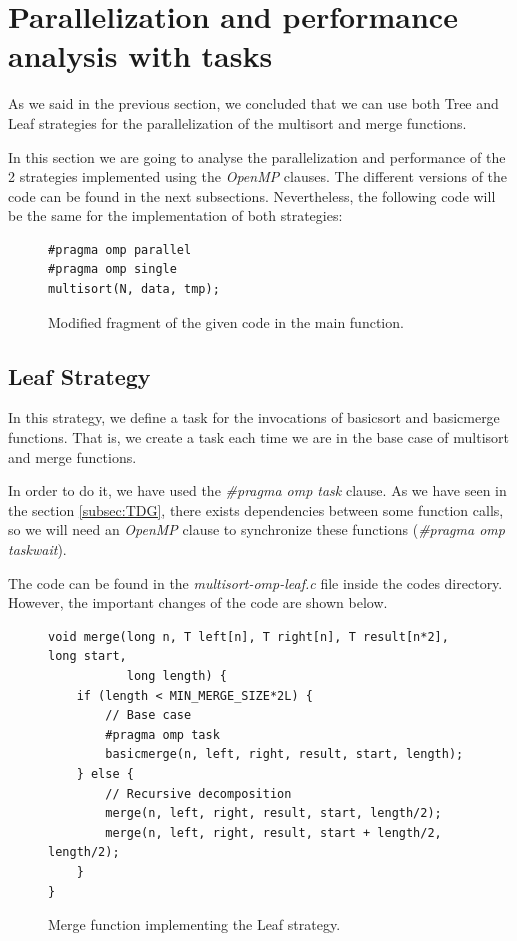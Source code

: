 \documentclass[12pt, a4paper]{article}
\begin{document}
\section{Parallelization and performance analysis with tasks}

As we said in the previous section, we concluded that we can use both Tree and Leaf strategies for the parallelization of the multisort and merge functions.

In this section we are going to analyse the parallelization and performance of the 2 strategies implemented using the \textit{OpenMP} clauses. The different versions of the code can be found in the next subsections. Nevertheless, the following code will be the same for the implementation of both strategies:

\begin{figure}[H]
\begin{lstlisting}
#pragma omp parallel
#pragma omp single
multisort(N, data, tmp);
\end{lstlisting}

\caption{Modified fragment of the given code in the main function.}
\end{figure}

\subsection{Leaf Strategy}

In this strategy, we define a task for the invocations of basicsort and basicmerge functions. That is, we create a task each time we are in the base case of multisort and merge functions.

In order to do it, we have used the \textit{\#pragma omp task} clause. As we have seen in the section \ref{subsec:TDG}, there exists dependencies between some function calls, so we will need an \textit{OpenMP} clause to synchronize these functions (\textit{\#pragma omp taskwait}).

The code can be found in the \textit{multisort-omp-leaf.c} file inside the codes directory. However, the important changes of the code are shown below.

\begin{figure}[H]
\begin{lstlisting}
void merge(long n, T left[n], T right[n], T result[n*2], long start,
		   long length) {
    if (length < MIN_MERGE_SIZE*2L) {
        // Base case
        #pragma omp task
        basicmerge(n, left, right, result, start, length);
    } else {
        // Recursive decomposition
        merge(n, left, right, result, start, length/2);
        merge(n, left, right, result, start + length/2, length/2);
    }
}
\end{lstlisting}

\caption{Merge function implementing the Leaf strategy.}
\end{figure}
\end{document}
